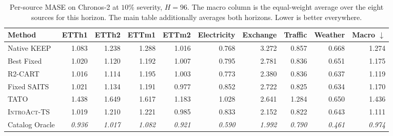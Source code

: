 \documentclass{article}
\newcommand{\oracle}[1]{\textit{\textcolor{phgray}{#1}}}
\newcommand{\introact}{\textsc{IntroAct-TS}}
\begin{document}
\begin{table}[!t]
  \caption{Per-source MASE on Chronos-2 at $10\%$ severity, $H=96$. The macro column is the
  equal-weight average over the eight sources for this horizon. The main table additionally averages both horizons. Lower is better everywhere.}
  \label{tab:app-src-ch2-96}
  \centering
  \small
  \setlength{\tabcolsep}{3pt}
\begin{tabular*}{\textwidth}{@{\extracolsep{\fill}}lrrrrrrrrr@{}}
    \toprule
    Method & ETTh1 & ETTh2 & ETTm1 & ETTm2 & Electricity & Exchange & Traffic & Weather & Macro $\downarrow$ \\
    \midrule
    Native KEEP & 1.083 & 1.238 & 1.288 & 1.016 & 0.768 & 3.272 & 0.857 & 0.668 & 1.274 \\
    Best Fixed & 1.020 & 1.120 & 1.192 & 1.007 & 0.795 & 2.781 & 0.836 & 0.651 & 1.175 \\
    R2-CART & 1.016 & 1.114 & 1.195 & 1.003 & 0.773 & 2.380 & 0.836 & 0.637 & 1.119 \\
    Fixed SAITS & 1.021 & 1.134 & 1.191 & 0.977 & 0.852 & 2.722 & 0.825 & 0.634 & 1.170 \\
    TATO & 1.438 & 1.649 & 1.617 & 1.183 & 1.028 & 2.641 & 1.284 & 0.650 & 1.436 \\
    \midrule
    \rowcolor{bestgray}\introact{} & 1.019 & 1.210 & 1.221 & 0.985 & 0.833 & 2.152 & 0.822 & 0.643 & 1.111 \\
    \midrule
    Catalog Oracle & \oracle{0.936} & \oracle{1.017} & \oracle{1.082} & \oracle{0.921} & \oracle{0.590} & \oracle{1.992} & \oracle{0.790} & \oracle{0.461} & \oracle{0.974} \\
    \bottomrule
  \end{tabular*}
\end{table}
\end{document}
